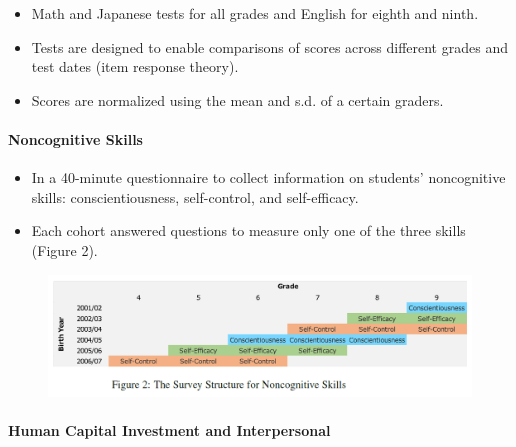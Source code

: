 \documentclass[../root]{subfiles}
\begin{document}
    \begin{itemize}
      \item Math and Japanese tests for all grades and English for eighth and ninth.
      \item Tests are designed to enable comparisons of scores across different grades and test dates (item response theory).
      \item Scores are normalized using the mean and s.d. of a certain graders.
    \end{itemize}

    \paragraph{Noncognitive Skills}

    \begin{itemize}
      \item In a 40-minute questionnaire to collect information on students' noncognitive skills: conscientiousness, self-control, and self-efficacy.
      \item Each cohort answered questions to measure only one of the three skills (Figure 2).
    \end{itemize}

    \begin{figure}[ht]
      \centering
      \includegraphics[scale = .8]{0904tanji/F2}
    \end{figure}

    \paragraph{Human Capital Investment and Interpersonal}
\end{document}
